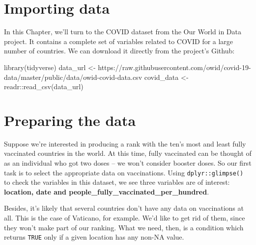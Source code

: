 \documentclass[
]{book}
\newenvironment{Shaded}{\begin{snugshade}}{\end{snugshade}}
\newcommand{\FunctionTok}[1]{\textcolor[rgb]{0.00,0.00,0.00}{#1}}
\newcommand{\NormalTok}[1]{#1}
\newcommand{\OtherTok}[1]{\textcolor[rgb]{0.56,0.35,0.01}{#1}}
\newcommand{\SpecialCharTok}[1]{\textcolor[rgb]{0.00,0.00,0.00}{#1}}
\newcommand{\StringTok}[1]{\textcolor[rgb]{0.31,0.60,0.02}{#1}}
\begin{document}
\hypertarget{importing-data-1}{%
\section{Importing data}\label{importing-data-1}}

In this Chapter, we'll turn to the COVID dataset from the Our World in Data project. It contains a complete set of variables related to COVID for a large number of countries. We can download it directly from the project's Github:

\begin{Shaded}
\begin{Highlighting}[]
\FunctionTok{library}\NormalTok{(tidyverse)}
\NormalTok{data\_url }\OtherTok{\textless{}{-}} \StringTok{\textquotesingle{}https://raw.githubusercontent.com/owid/covid{-}19{-}data/master/public/data/owid{-}covid{-}data.csv\textquotesingle{}}
\NormalTok{covid\_data }\OtherTok{\textless{}{-}}\NormalTok{ readr}\SpecialCharTok{::}\FunctionTok{read\_csv}\NormalTok{(data\_url)}
\end{Highlighting}
\end{Shaded}

\hypertarget{preparing-the-data-1}{%
\section{Preparing the data}\label{preparing-the-data-1}}

Suppose we're interested in producing a rank with the ten's most and least fully vaccinated countries in the world. At this time, fully vaccinated can be thought of as an individual who got two doses -- we won't consider booster doses. So our first task is to select the appropriate data on vaccinations. Using \texttt{dplyr::glimpse()} to check the variables in this dataset, we see three variables are of interest: \textbf{location, date and people\_fully\_vaccinated\_per\_hundred}.

Besides, it's likely that several countries don't have any data on vaccinations at all. This is the case of Vaticano, for example. We'd like to get rid of them, since they won't make part of our ranking. What we need, then, is a condition which returns \texttt{TRUE} only if a given location has any non-NA value.
\end{document}
